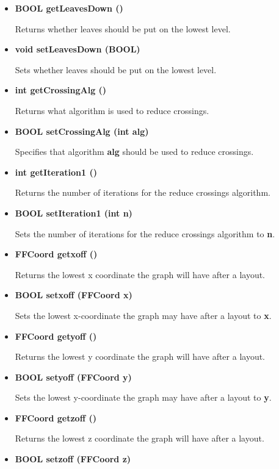 \begin{itemize}
\item{\bf BOOL getLeavesDown ()}

Returns whether leaves should be put on the lowest level.

\item{\bf void setLeavesDown (BOOL)}
  
Sets whether leaves should be put on the lowest level.

\item{\bf int getCrossingAlg ()}

Returns what algorithm is used to reduce crossings.

\item{\bf BOOL setCrossingAlg (int alg)}
  
  Specifies that algorithm {\bf alg} should be used to reduce
  crossings.

\item{\bf int getIteration1 ()}
  
  Returns the number of iterations for the reduce crossings
  algorithm.

\item{\bf BOOL setIteration1 (int n)}
  
  Sets the number of iterations for the reduce crossings
  algorithm to {\bf n}.

\item{\bf FFCoord getxoff ()}
  
  Returns the lowest x coordinate the graph will have after a
  layout.

\item{\bf BOOL setxoff (FFCoord x)}
  
  Sets the lowest x-coordinate the graph may have after a layout
  to {\bf x}.

\item{\bf FFCoord getyoff ()}

  Returns the lowest y coordinate the graph will have after a
  layout.

\item{\bf BOOL setyoff (FFCoord y)}

  Sets the lowest y-coordinate the graph may have after a layout
  to {\bf y}.

\item{\bf FFCoord getzoff ()}

  Returns the lowest z coordinate the graph will have after a
  layout.

\item{\bf BOOL setzoff (FFCoord z)}
  

\end{itemize}
